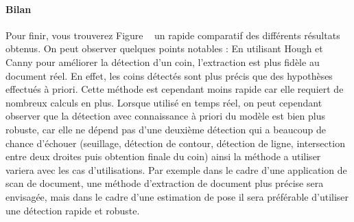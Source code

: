 \paragraph{Bilan}
Pour finir, vous trouverez Figure ~\label{fig:docdetect:results}
un rapide comparatif des différents résultats obtenus. On peut observer quelques points notables : En utilisant Hough et Canny pour améliorer la détection d'un coin, l'extraction est plus fidèle au document réel. En effet, les coins détectés sont plus précis que des hypothèses effectués à priori. Cette méthode est cependant moins rapide car elle requiert de nombreux calculs en plus. Lorsque utilisé en temps réel, on peut cependant observer que la détection avec connaissance à priori du modèle est bien plus robuste, car elle ne dépend pas d'une deuxième détection qui a beaucoup de chance d'échouer (seuillage, détection de contour, détection de ligne, intersection entre deux droites puis obtention finale du coin) ainsi la méthode a utiliser variera avec les cas d'utilisations. Par exemple dans le cadre d'une application de scan de document, une méthode d'extraction de document plus précise sera envisagée, mais dans le cadre d'une estimation de pose il sera préférable d'utiliser une détection rapide et robuste.

